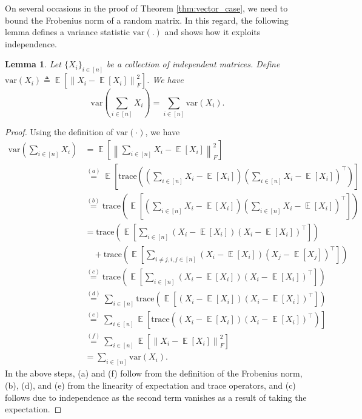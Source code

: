 \documentclass[letterpaper, 11 pt]{article}
\newcommand{\normlr}[1]{\left\lVert#1\right\rVert}
\newcommand{\tr}[1]{\text{trace}\left( #1 \right)}
\DeclareMathOperator{\E}{\mathbb{E}}
\newtheorem{lemma}{Lemma}
\begin{document}
On several occasions in the proof of Theorem \ref{thm:vector_case}, we need to bound the Frobenius norm of a random matrix. In this regard, the following lemma defines a variance statistic $\text{var}(.)$ and shows how it exploits independence.
\begin{lemma} \label{lemma:var_statistic}
    Let $\{X_i\}_{i \in [n]}$ be a collection of independent matrices. Define $\text{var}(X_i) \triangleq \E[\normlr{X_i - \E[X_i]}_F^2]$. We have $$\text{var}\left(\sum_{i \in [n]} X_i \right) = \sum_{i \in [n]} \text{var}(X_i).$$
\end{lemma}
\begin{proof}
    Using the definition of $\text{var}(\cdot)$, we have 
    \begin{align*}
       \text{var}\left(\sum_{i \in [n]} X_i \right) & = \E\left[\normlr{\sum_{i \in [n]} X_i - \E[X_i]}_F^2\right] \\
       & \overset{(a)}{=}  \E\left[\tr{\left(\sum_{i \in [n]} X_i - \E[X_i] \right) \left(\sum_{i \in [n]} X_i - \E[X_i] \right)^{\top}}\right] \\
       & \overset{(b)}{=} \tr{\E\left[ \left(\sum_{i \in [n]} X_i - \E[X_i] \right) \left(\sum_{i \in [n]} X_i - \E[X_i] \right)^{\top} \right]} \\
       & = \tr{\E \left[ \sum_{i \in [n]} (X_i - \E[X_i])(X_i - \E[X_i])^{\top} \right]}  \\
       & \quad + \tr{\E \left[ \sum_{i \neq j, i, j\in [n]} (X_i - \E[X_i])(X_j - \E[X_j])^{\top} \right]} \\
       & \overset{(c)}{=} \tr{\E \left[ \sum_{i \in [n]} (X_i - \E[X_i])(X_i - \E[X_i])^{\top} \right]} \\
       & \overset{(d)}{=}\sum_{i \in [n]} \tr{\E\left[(X_i - \E[X_i])(X_i - \E[X_i])^{\top}\right]} \\
       & \overset{(e)}{=} \sum_{i \in [n]} \E\left[\tr{(X_i - \E[X_i])(X_i - \E[X_i])^{\top}}\right] \\
       & \overset{(f)}{=} \sum_{i \in [n]} \E\left[\normlr{X_i - \E[X_i]}_F^2\right] \\
       & = \sum_{i \in [n]} \text{var}(X_i).
    \end{align*}
    In the above steps, (a) and (f) follow from the definition of the Frobenius norm, (b), (d), and (e) from the linearity of expectation and trace operators, and (c) follows due to independence as the second term vanishes as a result of taking the expectation.
\end{proof}
\end{document}
